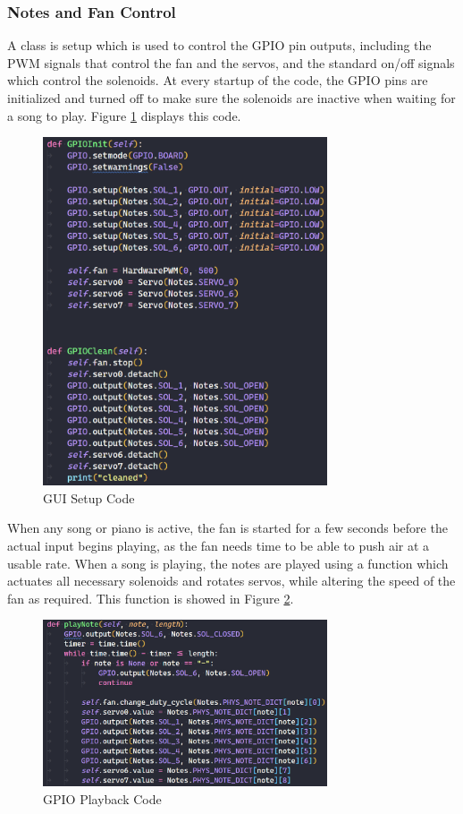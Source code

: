 \documentclass[UTF8, 12pt]{article}
\begin{document}
\subsubsection{Notes and Fan Control}
    A class is setup which is used to control the GPIO pin outputs, including the PWM signals that control the fan and the servos, and the standard on/off signals which control the solenoids. At every startup of the code, the GPIO pins are initialized and turned off to make sure the solenoids are inactive when waiting for a song to play. Figure \ref{gpio_init_fig} displays this code.
    \begin{figure}[h]
        \centering
        \includegraphics[width=0.75\textwidth]{gpio_init_code.png}
        \caption{GUI Setup Code}
        \label{gpio_init_fig}
    \end{figure}
    When any song or piano is active, the fan is started for a few seconds before the actual input begins playing, as the fan needs time to be able to push air at a usable rate. When a song is playing, the notes are played using a function which actuates all necessary solenoids and rotates servos, while altering the speed of the fan as required. This function is showed in Figure \ref{gpio_play_fig}.
    \begin{figure}[h]
        \centering
        \includegraphics[width=0.75\textwidth]{gpio_play.png}
        \caption{GPIO Playback Code}
        \label{gpio_play_fig}
    \end{figure}
\end{document}
